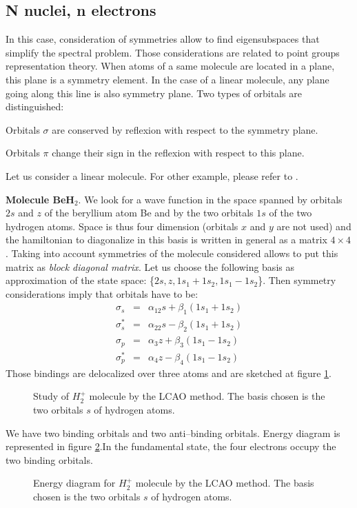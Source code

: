 \documentclass[12pt]{book}
\begin{document}
\subsection{N nuclei, n electrons}\label{secnnne}
In this case, consideration of symmetries allow to find eigensubspaces that
simplify the spectral problem. Those considerations are related to point
groups representation theory. When atoms of a same molecule are located in a
plane, this plane is a symmetry element. In the case of a linear molecule, any
plane going along this line is also symmetry plane. Two types of orbitals are distinguished:
\begin{defn}
Orbitals $\sigma$ are conserved by reflexion with respect to the symmetry
plane. 
\end{defn}
\begin{defn}
Orbitals $\pi$ change their sign in the reflexion with respect to this plane. 
\end{defn}
Let us consider a linear molecule. For other example, please refer to
\cite{ph:mecaq:Pauling60}. 
\begin{exmp}
{\bf Molecule BeH$_2$}.
We look for a wave function in the space spanned by orbitals $2s$ and $z$ of
the beryllium atom Be and by the two orbitals $1s$ of the two hydrogen
atoms. Space is thus four dimension (orbitals $x$ and $y$ are not used) and
the hamiltonian to diagonalize in this basis is written in general as a matrix
$4\times 4$. 
Taking into account symmetries of the molecule considered allows to put this
matrix as  {\it block diagonal matrix}. Let us choose the following basis as
approximation of the state space:
\{$2s,z,1s_1+1s_2,1s_1-1s_2$\}. Then symmetry considerations imply that
orbitals have to be:
\begin{eqnarray}
\sigma_s&=&\alpha_12s+\beta_1(1s_1+1s_2)\\
\sigma_s^*&=&\alpha_22s-\beta_2(1s_1+1s_2)\\
\sigma_p&=&\alpha_3z+\beta_3(1s_1-1s_2)\\
\sigma_p^*&=&\alpha_4z-\beta_4(1s_1-1s_2)
\end{eqnarray}
Those bindings are delocalized over three atoms and are sketched at figure
\ref{figBeH2orb}. 
\begin{figure}[htb]
 \centerline{}   
 \caption{Study of $H_2^+$ molecule by the LCAO method. The basis
   chosen is the two orbitals $s$ of hydrogen atoms.}
 \label{figBeH2orb}
\end{figure}
We have two binding orbitals and two anti--binding orbitals. Energy diagram
is represented in figure \ref{figBeH2ene}.In the fundamental state, the four
electrons occupy the two binding orbitals.
\begin{figure}[htb]
 \centerline{}   
 \caption{Energy diagram for $H_2^+$ molecule by the LCAO method. The basis
   chosen is the two orbitals $s$ of hydrogen atoms.}
 \label{figBeH2ene}
\end{figure}
\end{exmp}
\end{document}
